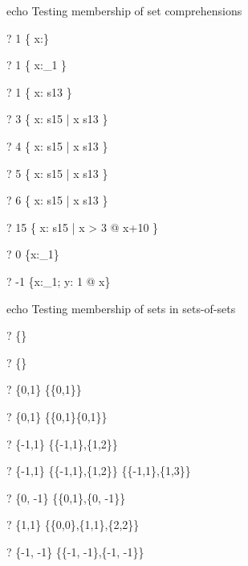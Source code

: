echo     Testing membership of set comprehensions
\begin{zed} \vdash?  1 \in    \{ x:\nat \} \end{zed}
\begin{zed} \vdash?  1 \in    \{ x:\nat_1 \} \end{zed}
\begin{zed} \vdash?  1 \in    \{ x: s13 \} \end{zed}
\begin{zed} \vdash?  3 \notin \{ x: s15 | x \notin s13 \} \end{zed}
\begin{zed} \vdash?  4 \in    \{ x: s15 | x \notin s13 \} \end{zed}
\begin{zed} \vdash?  5 \in    \{ x: s15 | x \notin s13 \} \end{zed}
\begin{zed} \vdash?  6 \notin \{ x: s15 | x \notin s13 \} \end{zed}
\begin{zed} \vdash?  15 \in   \{ x: s15 | x > 3 @ x+10 \} \end{zed}
\begin{zed} \vdash?  0 \notin \{x:\nat_1\} \end{zed}
\begin{zed} \vdash?  -1 \notin \{x:\nat_1; y: 1  @ x\} \end{zed}


echo     Testing membership of sets in sets-of-sets
\begin{zed} \vdash?  \emptyset \in \{\emptyset\} \end{zed}
\begin{zed} \vdash?  \emptyset \in \{\emptyset \cap \emptyset\} \end{zed}
\begin{zed} \vdash?  \{0,1\} \in \{\{0,1\}\} \end{zed}
\begin{zed} \vdash?  \{0,1\} \in \{\{0,1\}\cap\{0,1\}\} \end{zed}
\begin{zed} \vdash?  \{-1,1\} \in \{\{-1,1\},\{1,2\}\} \end{zed}
\begin{zed}
  \vdash?  \{-1,1\} \in \{\{-1,1\},\{1,2\}\} \cap \{\{-1,1\},\{1,3\}\}
\end{zed}
\begin{zed} \vdash?  \{0, -1\} \in \{\{0,1\},\{0, -1\}\} \end{zed}
\begin{zed} \vdash?  \{1,1\} \in \{\{0,0\},\{1,1\},\{2,2\}\} \end{zed}
\begin{zed} \vdash?  \{-1, -1\} \in \{\{-1, -1\},\{-1, -1\}\} \end{zed}

